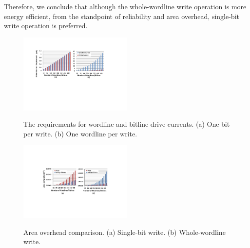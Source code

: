 Therefore, we conclude that although the whole-wordline write operation is
more energy efficient, from the standpoint of reliability and area
overhead, single-bit write operation is preferred.
\begin{figure}%
\centering
  \includegraphics[width=0.5\textwidth]{./figures/drive_i_f.pdf}\\  \vspace{-5pt}
  \caption{The requirements for wordline and bitline drive currents. (a) One bit per write. (b) One wordline per write.}\label{fig:drive_i}
  \vspace{-5pt}
\end{figure}



\begin{figure}%
\centering
  \includegraphics[width=0.5\textwidth]{./figures/area_comp_f1.pdf}\\  \vspace{-10pt}
  \caption{Area overhead comparison. (a) Single-bit write. (b) Whole-wordline write.}\label{fig:area_i}
\vspace{-15pt}
\end{figure}

%
%

